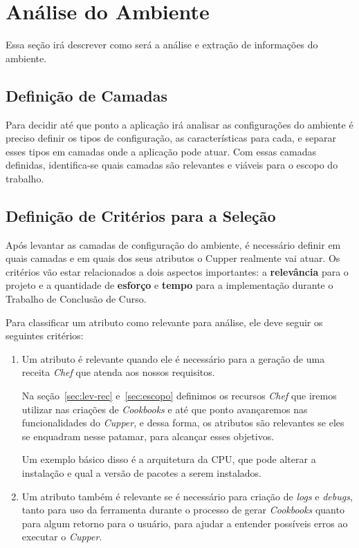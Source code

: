 \section{Análise do Ambiente}

Essa seção irá descrever como será a análise e extração de informações do ambiente.

\subsection{Definição de Camadas}
Para decidir até que ponto a aplicação irá analisar as configurações
do ambiente é preciso definir os tipos de configuração, as características para
cada, e separar esses tipos em camadas onde a aplicação pode atuar.
Com essas camadas definidas, identifica-se quais camadas são relevantes e viáveis
para o escopo do trabalho.


\subsection{Definição de Critérios para a Seleção}
\label{sec:defcritcamada}
Após levantar as camadas de configuração do ambiente, é necessário definir em
quais camadas e em quais dos seus atributos o Cupper realmente vai atuar. 
Os critérios vão estar relacionados a dois aspectos importantes: a \textbf{relevância} 
para o projeto e a quantidade de \textbf{esforço} e \textbf{tempo} para a implementação durante
o Trabalho de Conclusão de Curso.

Para classificar um atributo como relevante para análise, ele deve seguir os
seguintes critérios:

\begin{enumerate}
\item Um atributo é relevante quando ele é necessário para a geração de uma
receita \textit{Chef} que atenda aos nossos requisitos. 

Na seção~\ref{sec:lev-rec} e~\ref{sec:escopo} definimos os recursos \textit{Chef}
que iremos utilizar nas criações de \textit{Cookbooks} e até que ponto 
avançaremos nas funcionalidades do \textit{Cupper}, e dessa forma, os atributos
são relevantes se eles se enquadram nesse patamar, para alcançar esses objetivos.

Um exemplo básico disso é a arquitetura da CPU, que pode alterar a instalação
e qual a versão de pacotes a serem instalados.

\item Um atributo também é relevante se é necessário para criação de \textit{logs} 
e \textit{debugs}, tanto para uso da ferramenta durante o processo de gerar 
\textit{Cookbooks} quanto para algum retorno para o usuário, para ajudar 
a entender possíveis erros ao executar
o \textit{Cupper}.
\end{enumerate}

